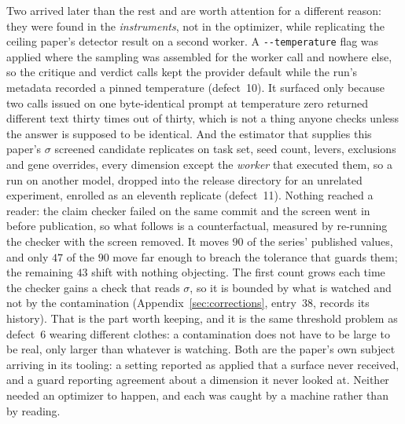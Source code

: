 \documentclass[11pt]{article}
\begin{document}
Two arrived later than the rest and are worth attention for a different reason: they were found in
the \emph{instruments}, not in the optimizer, while replicating the ceiling paper's detector result on a
second worker. A \texttt{-{}-temperature} flag was applied where the sampling was assembled for the
worker call and nowhere else, so the critique and verdict calls kept the provider default while the
run's metadata recorded a pinned temperature (defect~10). It surfaced only because two calls issued
on one byte-identical prompt at temperature zero returned different text thirty times out of thirty,
which is not a thing anyone checks unless the answer is supposed to be identical. And the estimator
that supplies this paper's $\sigma$ screened candidate replicates on task set, seed count, levers,
exclusions and gene overrides, every dimension except the \emph{worker} that executed them, so a run on
another model, dropped into the release directory for an unrelated experiment, enrolled as an
eleventh replicate (defect~11). Nothing reached a reader: the claim checker failed on the same
commit and the screen went in before publication, so what follows is a counterfactual, measured
by re-running the checker with the screen removed. It moves $90$ of the series' published
values, and only $47$ of the $90$ move far enough to breach the tolerance that guards them; the
remaining $43$ shift with nothing objecting. The first count grows each time the checker gains a
check that reads $\sigma$, so it is bounded by what is watched and not by the contamination
(Appendix~\ref{sec:corrections}, entry~38, records its history). That is the part worth keeping, and it is the same
threshold problem as defect~6 wearing different clothes: a contamination does not have to be
large to be real, only larger than whatever is watching. Both are the paper's own
subject arriving in its tooling: a setting reported as applied that a surface never received, and a
guard reporting agreement about a dimension it never looked at. Neither needed an optimizer to
happen, and each was caught by a machine rather than by reading.
\end{document}
